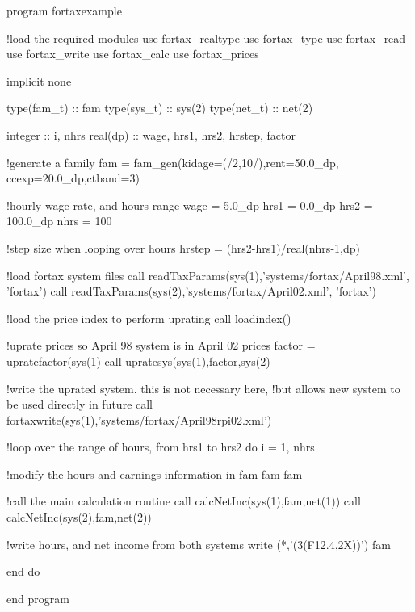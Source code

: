 \documentclass[11pt,thmsa,letter,ukenglish]{article}
\begin{document}
\begin{fortrancode}[title={Example code using FORTAX},frame=lines]
program fortaxexample

    !load the required modules
    use fortax_realtype
    use fortax_type
    use fortax_read
    use fortax_write
    use fortax_calc
    use fortax_prices
    
    implicit none
        
    type(fam_t) :: fam
    type(sys_t) :: sys(2)
    type(net_t) :: net(2)

    integer  :: i, nhrs
    real(dp) :: wage, hrs1, hrs2, hrstep, factor

    !generate a family
    fam = fam_gen(kidage=(/2,10/),rent=50.0_dp, ccexp=20.0_dp,ctband=3)
    
    !hourly wage rate, and hours range
    wage = 5.0_dp
    hrs1 = 0.0_dp
    hrs2 = 100.0_dp
    nhrs = 100

    !step size when looping over hours
    hrstep = (hrs2-hrs1)/real(nhrs-1,dp)
  
    !load fortax system files
    call readTaxParams(sys(1),'systems/fortax/April98.xml', 'fortax')
    call readTaxParams(sys(2),'systems/fortax/April02.xml', 'fortax')

    !load the price index to perform uprating
    call loadindex()

    !uprate prices so April 98 system is in April 02 prices
    factor = upratefactor(sys(1)%
    call upratesys(sys(1),factor,sys(2)%
    
    !write the uprated system. this is not necessary here,
    !but allows new system to be used directly in future
    call fortaxwrite(sys(1),'systems/fortax/April98rpi02.xml')
        
    !loop over the range of hours, from hrs1 to hrs2
    do i = 1, nhrs

        !modify the hours and earnings information in fam
        fam%
        fam%

        !call the main calculation routine
        call calcNetInc(sys(1),fam,net(1))
        call calcNetInc(sys(2),fam,net(2))

        !write hours, and net income from both systems
        write (*,'(3(F12.4,2X))') fam%

    end do
            
end program
\end{fortrancode}



\end{document}
